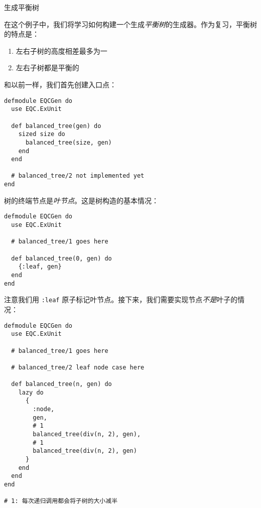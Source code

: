 \begin{example}{生成平衡树}

在这个例子中，我们将学习如何构建一个生成\emph{平衡树}的生成器。作为复习，平衡树的特点是：

\begin{enumerate}
	\item 左右子树的高度相差最多为一
  \item 左右子树都是平衡的
\end{enumerate}

和以前一样，我们首先创建入口点：

\begin{code}{}
\begin{verbatim}
defmodule EQCGen do
  use EQC.ExUnit

  def balanced_tree(gen) do
    sized size do
      balanced_tree(size, gen)
    end
  end

  # balanced_tree/2 not implemented yet
end
\end{verbatim}
\end{code}

树的终端节点是\emph{叶节点}。这是树构造的基本情况：

\begin{code}{}
\begin{verbatim}
defmodule EQCGen do
  use EQC.ExUnit

  # balanced_tree/1 goes here

  def balanced_tree(0, gen) do
    {:leaf, gen}
  end
end
\end{verbatim}
\end{code}

注意我们用 \texttt{:leaf}
原子标记叶节点。接下来，我们需要实现节点\emph{不是}叶子的情况：

\begin{code}{}
\begin{verbatim}
defmodule EQCGen do
  use EQC.ExUnit

  # balanced_tree/1 goes here

  # balanced_tree/2 leaf node case here

  def balanced_tree(n, gen) do
    lazy do
      {
        :node,
        gen,
        # 1
        balanced_tree(div(n, 2), gen),
        # 1
        balanced_tree(div(n, 2), gen)
      }
    end
  end
end

# 1: 每次递归调用都会将子树的大小减半
\end{verbatim}
\end{code}



\end{example}
